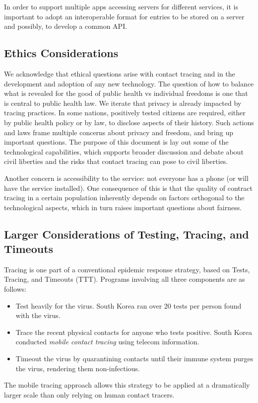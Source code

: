 \documentclass{article}
\begin{document}
In order to support multiple apps accessing servers for different services, it is important to adopt an interoperable format for entries to be stored on a server and possibly, to develop a common API.

\subsection{Ethics Considerations}
We acknowledge that ethical questions arise with contact tracing and in the development and adoption of any new technology. The question of how to balance what is revealed for the good of public health vs individual freedoms is one that is central to public health law. We iterate that privacy is already impacted by tracing practices. In some nations, positively tested citizens are required, either by public health policy or by law, 
to disclose aspects of their history. Such actions and laws frame multiple concerns about privacy and freedom, and bring up important questions.  The purpose of this document is lay out some of the technological capabilities, which supports broader discussion and debate about civil liberties and the risks that contact tracing can pose to civil liberties.

Another concern is accessibility to the service: not everyone has a phone (or will have the service installed). One consequence of this is that the quality of contract tracing in a certain population inherently depends on factors orthogonal to the technological aspects, which in turn raises important questions about fairness.



\subsection{Larger Considerations of Testing, Tracing, and Timeouts}
Tracing is one part of a conventional epidemic response strategy, based on Tests, Tracing, and Timeouts (TTT). Programs involving all three components are as follows:
\begin{itemize}
\item Test heavily for the virus.  South Korea ran over 20 tests per person found with the virus. 
\item Trace the recent physical contacts for anyone who tests positive.  South Korea conducted \emph{mobile contact tracing} using telecom information.
\item Timeout the virus by quarantining contacts until their immune system purges the virus, rendering them non-infectious.
\end{itemize}
The mobile tracing approach allows this strategy to be applied at a dramatically larger scale than only relying on human contact tracers.  
\end{document}
